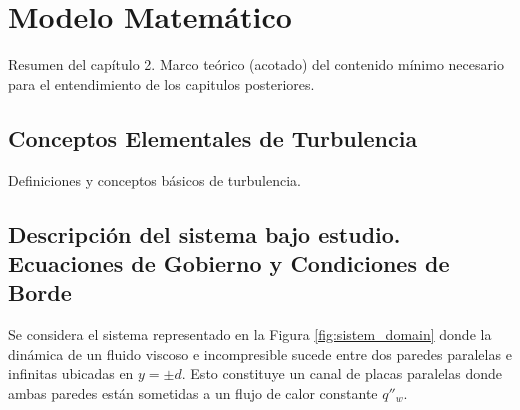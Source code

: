 \chapter{Modelo Matemático}

Resumen del capítulo 2. Marco teórico (acotado) del contenido mínimo necesario para el entendimiento de los
capitulos posteriores.

\newpage

\section{Conceptos Elementales de Turbulencia}
Definiciones y conceptos básicos de turbulencia.


\section{Descripción del sistema bajo estudio. Ecuaciones de Gobierno y Condiciones de Borde}

Se considera el sistema representado en la Figura \ref{fig:sistem_domain} donde la dinámica de un fluido viscoso e incompresible sucede entre dos paredes paralelas e infinitas ubicadas en $y=\pm d$. Esto constituye un canal de placas paralelas donde ambas paredes están sometidas a un flujo de calor constante $q''_w$.

